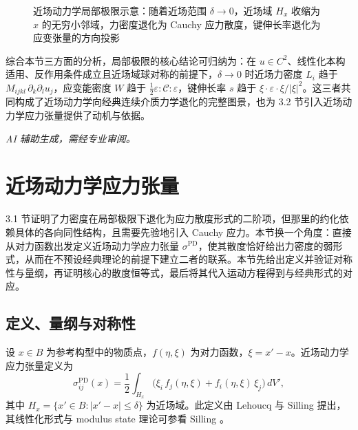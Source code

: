 \begin{figure}[htbp]
\centering
{}
\caption{近场动力学局部极限示意：随着近场范围 $\delta\to 0$，近场域 $H_x$ 收缩为 $x$ 的无穷小邻域，力密度退化为 Cauchy 应力散度，键伸长率退化为应变张量的方向投影}
\label{fig:local-limit}
\end{figure}

综合本节三方面的分析，局部极限的核心结论可归纳为：在 $u\in C^2$、线性化本构适用、反作用条件成立且近场域球对称的前提下，$\delta\to 0$ 时近场力密度 $L_i$ 趋于 $M_{ijkl}\,\partial_k\partial_l u_j$，应变能密度 $W$ 趋于 $\tfrac{1}{2}\varepsilon:\mathcal{C}:\varepsilon$，键伸长率 $s$ 趋于 $\xi\cdot\varepsilon\cdot\xi/|\xi|^2$。这三者共同构成了近场动力学向经典连续介质力学退化的完整图景，也为 3.2 节引入近场动力学应力张量提供了动机与依据。

\emph{AI 辅助生成，需经专业审阅。}

\section{近场动力学应力张量}
\label{sec:pd-stress}

3.1 节证明了力密度在局部极限下退化为应力散度形式的二阶项，但那里的约化依赖具体的各向同性结构，且需要先验地引入 Cauchy 应力。本节换一个角度：直接从对力函数出发定义近场动力学应力张量 $\sigma^{\mathrm{PD}}$，使其散度恰好给出力密度的弱形式，从而在不预设经典理论的前提下建立二者的联系。本节先给出定义并验证对称性与量纲，再证明核心的散度恒等式，最后将其代入运动方程得到与经典形式的对应。

\subsection{定义、量纲与对称性}
\label{subsec:pd-stress-def}

\begin{definition}[近场动力学应力张量]
\label{def:pd-stress}
设 $x\in B$ 为参考构型中的物质点，$f(\eta,\xi)$ 为对力函数，$\xi=x'-x$。近场动力学应力张量定义为
\begin{equation}
\label{eq:pd-stress-def}
\sigma^{\mathrm{PD}}_{ij}(x) = \frac{1}{2}\int_{H_x}\bigl(\xi_i\,f_j(\eta,\xi) + f_i(\eta,\xi)\,\xi_j\bigr)\,dV',
\end{equation}
其中 $H_x=\{x'\in B:|x'-x|\le\delta\}$ 为近场域。此定义由 Lehoucq 与 Silling \cite{LehoucqSilling2008} 提出，其线性化形式与 modulus state 理论可参看 Silling \cite{Silling2010}。
\end{definition}

